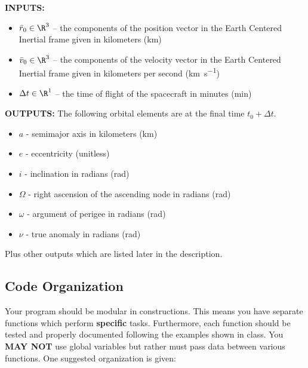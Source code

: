 \documentclass[11pt, reqno]{article}    %
\begin{document}
\noindent \textbf{INPUTS:}
\begin{itemize}
    \item \( \bar r_0 \in \R^{3} \) -- the components of the position vector in the Earth Centered Inertial frame given in kilometers (\si{\kilo\meter})
    \item \( \bar v_0 \in \R^{3} \) -- the components of the velocity vector in the Earth Centered Inertial frame given in kilometers per second (\si{\kilo\meter\per\second})
    \item \( \Delta t \in \R^{1} \) -- the time of flight of the spacecraft in minutes (\si{\minute})
\end{itemize}

\noindent \textbf{OUTPUTS:}
The following orbital elements are at the final time \( t_0 + \Delta t \).
\begin{itemize}
    \item \( a \)  - semimajor axis in kilometers (\si{\kilo\meter})
    \item \( e \) - eccentricity (unitless)
    \item \( i \) - inclination in radians (\si{\radian})
    \item \( \Omega \) - right ascension of the ascending node in radians (\si{\radian})
    \item \( \omega \) - argument of perigee in radians (\si{\radian})
    \item \( \nu \) - true anomaly in radians (\si{\radian})
\end{itemize}
Plus other outputs which are listed later in the description.

\subsection*{Code Organization} 
Your program should be modular in constructions. 
This means you have separate functions which perform \textbf{specific} tasks.
Furthermore, each function should be tested and properly documented following the examples shown in class.
You \textbf{MAY NOT}  use global variables but rather must pass data between various functions.
One suggested organization is given:
\end{document}
